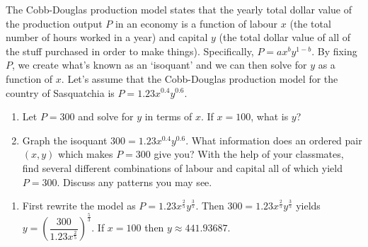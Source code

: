 {The Cobb-Douglas production model states that the yearly total dollar value of the production output $P$ in an economy is a function of labour $x$ (the total number of hours worked in a year) and capital $y$ (the total dollar value of all of the stuff purchased in order to make things).  Specifically, $P = ax^{b}y^{1 - b}$.  By fixing $P$, we create what's known as an `isoquant' and we can then solve for $y$ as a function of $x$.  Let's assume that the Cobb-Douglas production model for the country of Sasquatchia is $P = 1.23x^{0.4}y^{0.6}$.  

\begin{enumerate}

\item Let $P = 300$ and solve for $y$ in terms of $x$.  If $x = 100$, what is $y$?

\item Graph the isoquant $300 = 1.23x^{0.4}y^{0.6}$.  What information does an ordered pair $(x, y)$ which makes $P = 300$ give you?  With the help of your classmates, find several different combinations of labour and capital all of which yield $P = 300$.  Discuss any patterns you may see.

\end{enumerate}}
{\begin{enumerate}

\item First rewrite the model as $P = 1.23x^{\frac{2}{5}}y^{\frac{3}{5}}$.  Then $300 = 1.23x^{\frac{2}{5}}y^{\frac{3}{5}}$ yields $y = \left( \dfrac{300}{1.23x^{\frac{2}{5}}} \right)^{\frac{5}{3}}$.  If $x = 100$ then $y \approx 441.93687$.

\end{enumerate}}